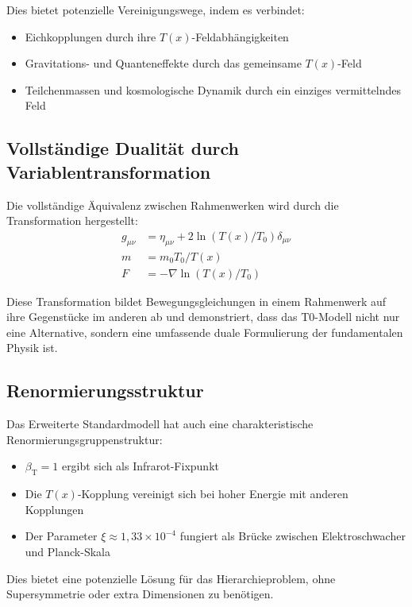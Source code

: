 \documentclass[12pt,a4paper]{article}
\newcommand{\Tfield}{T(x)}
\newcommand{\betaT}{\beta_{\text{T}}}
\newcommand{\Tzero}{T_0}
\begin{document}
	Dies bietet potenzielle Vereinigungswege, indem es verbindet:
	\begin{itemize}
		\item Eichkopplungen durch ihre $\Tfield$-Feldabhängigkeiten
		\item Gravitations- und Quanteneffekte durch das gemeinsame $\Tfield$-Feld
		\item Teilchenmassen und kosmologische Dynamik durch ein einziges vermittelndes Feld
	\end{itemize}
	
	\subsection{Vollständige Dualität durch Variablentransformation}
	
	Die vollständige Äquivalenz zwischen Rahmenwerken wird durch die Transformation hergestellt:
	\begin{equation}
		\begin{aligned}
			g_{\mu\nu} &= \eta_{\mu\nu} + 2 \ln(\Tfield / \Tzero) \delta_{\mu\nu} \\
			m &= m_0 \Tzero / \Tfield \\
			F &= -\nabla \ln(\Tfield / \Tzero)
		\end{aligned}
	\end{equation}
	
	Diese Transformation bildet Bewegungsgleichungen in einem Rahmenwerk auf ihre Gegenstücke im anderen ab und demonstriert, dass das T0-Modell nicht nur eine Alternative, sondern eine umfassende duale Formulierung der fundamentalen Physik ist.
	
	\subsection{Renormierungsstruktur}
	
	Das Erweiterte Standardmodell hat auch eine charakteristische Renormierungsgruppenstruktur:
	\begin{itemize}
		\item $\betaT = 1$ ergibt sich als Infrarot-Fixpunkt
		\item Die $\Tfield$-Kopplung vereinigt sich bei hoher Energie mit anderen Kopplungen
		\item Der Parameter $\xi \approx 1,33 \times 10^{-4}$ fungiert als Brücke zwischen Elektroschwacher und Planck-Skala
	\end{itemize}
	
	Dies bietet eine potenzielle Lösung für das Hierarchieproblem, ohne Supersymmetrie oder extra Dimensionen zu benötigen.
	
\end{document}
